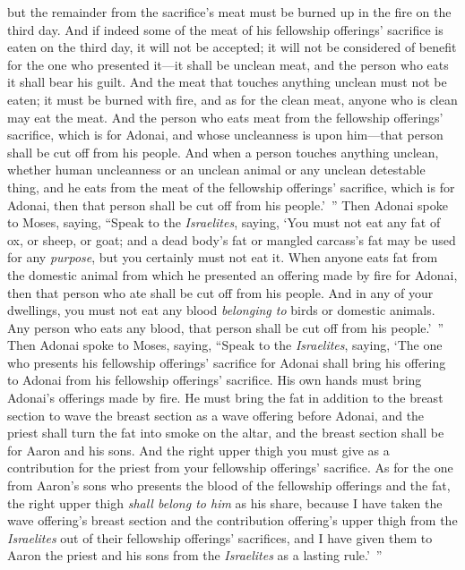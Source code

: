 \begin{biblechapter}
\verse but the remainder from the sacrifice’s meat must be burned up in the fire on the third day.
\verse And if indeed some of the meat of his fellowship offerings’ sacrifice is eaten on the third day, it will not be accepted; it will not be considered of benefit for the one who presented it—it shall be unclean meat, and the person who eats it shall bear his guilt.
\verse And the meat that touches anything unclean must not be eaten; it must be burned with fire, and as for the clean meat, anyone who is clean may eat the meat.
\verse And the person who eats meat from the fellowship offerings’ sacrifice, which is for Adonai, and whose uncleanness is upon him—that person shall be cut off from his people.
\verse And when a person touches anything unclean, whether human uncleanness or an unclean animal or any unclean detestable thing, and he eats from the meat of the fellowship offerings’ sacrifice, which is for Adonai, then that person shall be cut off from his people.’ ”
 Then Adonai spoke to Moses, saying,
\verse “Speak to the \textit{Israelites}, saying, ‘You must not eat any fat of ox, or sheep, or goat;
\verse and a dead body’s fat or mangled carcass’s fat may be used for any \textit{purpose}, but you certainly must not eat it.
\verse When anyone eats fat from the domestic animal from which he presented an offering made by fire for Adonai, then that person who ate shall be cut off from his people.
\verse And in any of your dwellings, you must not eat any blood \textit{belonging to} birds or domestic animals.
\verse Any person who eats any blood, that person shall be cut off from his people.’ ”
 Then Adonai spoke to Moses, saying,
\verse “Speak to the \textit{Israelites}, saying, ‘The one who presents his fellowship offerings’ sacrifice for Adonai shall bring his offering to Adonai from his fellowship offerings’ sacrifice.
\verse His own hands must bring Adonai’s offerings made by fire. He must bring the fat in addition to the breast section to wave the breast section as a wave offering before Adonai,
\verse and the priest shall turn the fat into smoke on the altar, and the breast section shall be for Aaron and his sons.
\verse And the right upper thigh you must give as a contribution for the priest from your fellowship offerings’ sacrifice.
\verse As for the one from Aaron’s sons who presents the blood of the fellowship offerings and the fat, the right upper thigh \textit{shall belong to him} as his share,
\verse because I have taken the wave offering’s breast section and the contribution offering’s upper thigh from the \textit{Israelites} out of their fellowship offerings’ sacrifices, and I have given them to Aaron the priest and his sons from the \textit{Israelites} as a lasting rule.’ ”

\end{biblechapter}

